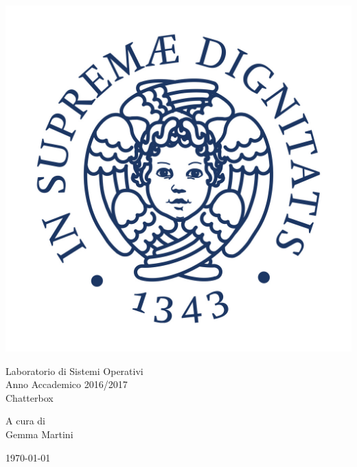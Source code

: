 \documentclass[12pt,a4paper]{article}
\begin{document}
\begin{titlepage}
\begin{center}
\vspace{3cm}

\begin{center}
\includegraphics[scale=0.3]{Cherubino.jpg}
\end{center}

\vspace{1.5cm}

\Huge
{\sc Laboratorio di Sistemi Operativi}\\
\Large
Anno Accademico 2016/2017\\

\vspace{1cm}
\huge
{\sc Chatterbox}\\

\vspace{1.5cm}

\Large
A cura di\\
{\sc Gemma Martini}\\

\vspace{1.5cm}

\today

\vfill

\end{center}
\end{titlepage}
\end{document}
